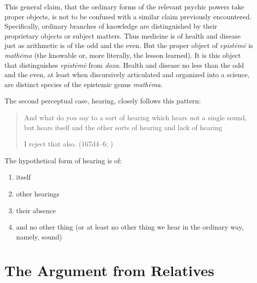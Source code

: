 This general claim, that the ordinary forms of the relevant psychic powers take proper objects, is not to be confused with a similar claim previously encountered. Specifically, ordinary branches of knowledge are distinguished by their proprietary objects or subject matters. Thus medicine is of health and disease just as arithmetic is of the odd and the even. But the proper object of \emph{epistēmē} is \emph{mathēma} (the knowable or, more literally, the lesson learned). It is this object that distinguishes \emph{epistēmē} from \emph{doxa}. Health and disease no less than the odd and the even, at least when discursively articulated and organized into a science, are distinct species of the epistemic genus \emph{mathēma}.

The second perceptual case, hearing, closely follows this pattern:
\begin{quote}
	And what do you say to a sort of hearing which hears not a single sound, but hears itself and the other sorts of hearing and lack of hearing
	
	I reject that also. (167d4–6; \citealt[59]{Lamb:1927qw})
\end{quote}
The hypothetical form of hearing is of:
\begin{enumerate}[(1)]
	\item itself
	\item other hearings
	\item their absence
	\item and no other thing (or at least no other thing we hear in the ordinary way, namely, sound)
\end{enumerate}




\section{The Argument from Relatives} %
\label{sec:the_argument_from_relatives}





